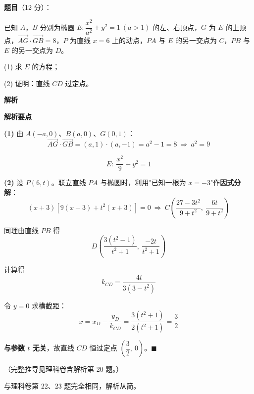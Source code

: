 \begin{answer}

\textbf{题目}（12 分）：

已知 $A$，$B$ 分别为椭圆 $E:\dfrac{x^{2}}{a^{2}}+y^{2}=1\ (a>1)$ 的左、右顶点，$G$ 为 $E$ 的上顶点，$\overrightarrow{AG}\cdot\overrightarrow{GB}=8$，$P$ 为直线 $x=6$ 上的动点，$PA$ 与 $E$ 的另一交点为 $C$，$PB$ 与 $E$ 的另一交点为 $D$。

  (1) 求 $E$ 的方程；

  (2) 证明：直线 $CD$ 过定点。

\textbf{解析}

\textbf{解析要点}

\textbf{(1)} 由 $A(-a,0)$、$B(a,0)$、$G(0,1)$：
\nopagebreak[4]
\[\overrightarrow{AG}\cdot\overrightarrow{GB}=(a,1)\cdot(a,-1)=a^{2}-1=8\ \Longrightarrow\ a^{2}=9\]

\nopagebreak[4]
\[E:\ \frac{x^{2}}9+y^{2}=1\]

\textbf{(2)} 设 $P(6,t)$。联立直线 $PA$ 与椭圆时，利用"已知一根为 $x=-3$"作\textbf{因式分解}：
\nopagebreak[4]
\[(x+3)\left[9(x-3)+t^{2}(x+3)\right]=0\ \Longrightarrow\ C\left(\frac{27-3t^{2}}{9+t^{2}},\ \frac{6t}{9+t^{2}}\right)\]

同理由直线 $PB$ 得
\nopagebreak[4]
\[D\left(\frac{3\left(t^{2}-1\right)}{t^{2}+1},\ \frac{-2t}{t^{2}+1}\right)\]

计算得
\nopagebreak[4]
\[k_{CD}=\frac{4t}{3\left(3-t^{2}\right)}\]

令 $y=0$ 求横截距：
\nopagebreak[4]
\[x=x_D-\frac{y_D}{k_{CD}}=\frac{3\left(t^{2}+1\right)}{2\left(t^{2}+1\right)}=\frac32\]

\textbf{与参数 $t$ 无关}，故直线 $CD$ 恒过定点 $\left(\dfrac32,\ 0\right)$。$\blacksquare$

（完整推导见理科卷含解析第 20 题。）



\par\medskip

\end{answer}

\begin{gktip}
与理科卷第 22、23 题完全相同，解析从简。
\end{gktip}

